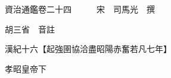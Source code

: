 










 


 
 


 

  
  
  
  
  





  
  
  
  
  
 
  

  

  
  
  



  

 
 

  
   




  

  
  


  　　資治通鑑卷二十四　　　宋　司馬光　撰

　　胡三省　音註

　　漢紀十六【起強圉協洽盡昭陽赤奮若凡七年】

　　孝昭皇帝下

